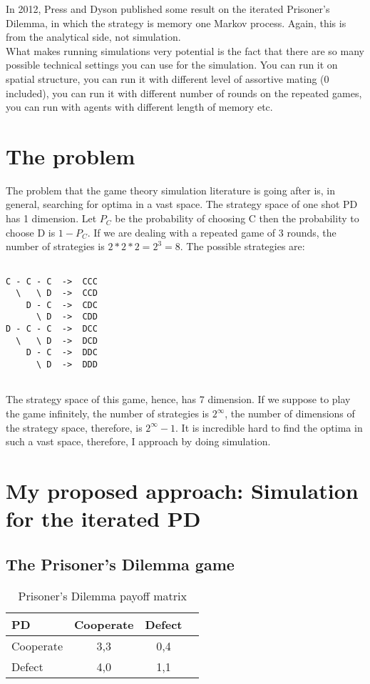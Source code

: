 \documentclass[12.5pt]{report}
\begin{document}
In 2012, Press and Dyson published some result on the iterated Prisoner's Dilemma, in which the strategy is memory one Markov process. Again, this is from the analytical side, not simulation.\\

What makes running simulations very potential is the fact that there are so many possible technical settings you can use for the simulation. You can run it on spatial structure, you can run it with different level of assortive mating (0 included), you can run it with different number of rounds on the repeated games, you can run with agents with different length of memory etc.


\chapter{The problem}
The problem that the game theory simulation literature is going after is, in general, searching for optima in a vast space. The strategy space of one shot PD has 1 dimension. Let $P_{C}$ be the probability of choosing C then the probability to choose D is $1 - P_C$. If we are dealing with a repeated game of 3 rounds, the number of strategies is $2*2*2 = 2^3 = 8$. The possible strategies are:

\begin{verbatim}

C - C - C  ->  CCC
  \   \ D  ->  CCD
    D - C  ->  CDC
      \ D  ->  CDD
D - C - C  ->  DCC
  \   \ D  ->  DCD
    D - C  ->  DDC
      \ D  ->  DDD
      
\end{verbatim}

The strategy space of this game, hence, has 7 dimension. If we suppose to play the game infinitely, the number of strategies is $2^{\infty}$, the number of dimensions of the strategy space, therefore, is $2^{\infty} - 1$. It is incredible hard to find the optima in such a vast space, therefore, I approach by doing simulation.


\chapter{My proposed approach: Simulation for the iterated PD}

\section{The Prisoner's Dilemma game}

\begin{table}[h!]
\center
\begin{tabular}{l|ccc}
\textbf{PD} & Cooperate & Defect \\
\hline
Cooperate & 3,3 & 0,4 \\
Defect    & 4,0 & 1,1 \\

\end{tabular}
\caption{Prisoner's Dilemma payoff matrix}
\end{table}
\end{document}
